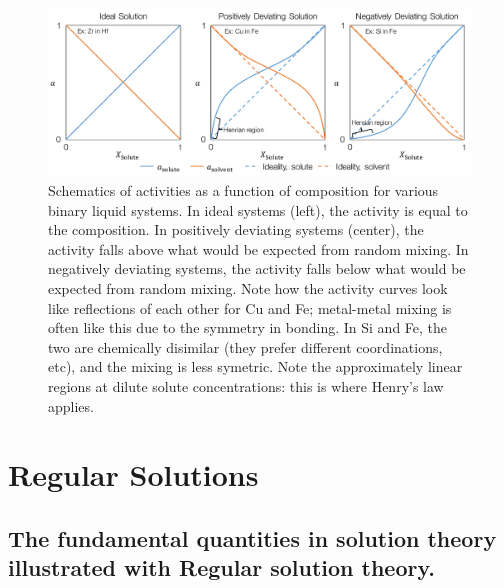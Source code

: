 \documentclass[12pt]{article}
\begin{document}
\begin{figure}[h]
\centering
\includegraphics[width=\textwidth]{activities_with_composition}
\caption{Schematics of activities as a function of composition for various binary liquid systems. In ideal systems (left), the activity is equal to the composition. In positively deviating systems (center), the activity falls above what would be expected from random mixing. In negatively deviating systems, the activity falls below what would be expected from random mixing. Note how the activity curves look like reflections of each other for Cu and Fe; metal-metal mixing is often like this due to the symmetry in bonding. In Si and Fe, the two are chemically disimilar (they prefer different coordinations, etc), and the mixing is less symetric. Note the approximately linear regions at dilute solute concentrations: this is where Henry's law applies.}
\label{activityComposition}
\end{figure}

\section{Regular Solutions}

\subsection{The fundamental quantities in solution theory illustrated with Regular solution theory.}
\end{document}
